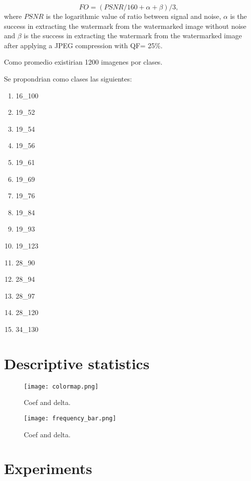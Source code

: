 \documentclass[runningheads]{llncs}
\begin{document}
\begin{equation}
FO = (PSNR/160 + \alpha + \beta)/3,
\label{FA}
\end{equation}
where $PSNR$ is the logarithmic value of ratio between signal and noise, $ \alpha $ is the success in extracting the watermark from the watermarked image without noise and $ \beta $ is the success in extracting the watermark from the watermarked image after applying a JPEG compression with QF= 25{\%}.

Como promedio existirian 1200 imagenes por clases.

Se propondrian como clases las siguientes:
\begin{enumerate}
	\item 16\_100
	\item 19\_52
	\item 19\_54
	\item 19\_56
	\item 19\_61
	\item 19\_69
	\item 19\_76
	\item 19\_84
	\item 19\_93
	\item 19\_123
	\item 28\_90
	\item 28\_94
	\item 28\_97
	\item 28\_120
	\item 34\_130
\end{enumerate}

\section{Descriptive statistics}

\begin{figure} [H]
	\begin{center}
		\texttt{[image: colormap.png]}
		\caption{Coef and delta.} \label{colormap}
	\end{center}
\end{figure}

\begin{figure} [H]
	\begin{center}
		\texttt{[image: frequency\_bar.png]}
		\caption{Coef and delta.} \label{frequency_bar}
	\end{center}
\end{figure}

\section{Experiments}
\end{document}
